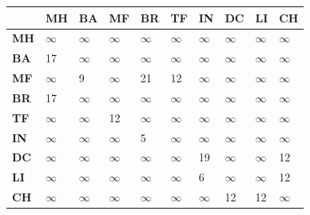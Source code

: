 \documentclass{article}
\begin{document}
\begin{enumerate}
\begin{table}[!h]
\centering
\begin{tabular}{|l|l|l|l|l|l|l|l|l|l|}
\hline
 & \textbf{MH} & \textbf{BA} & \textbf{MF} & \textbf{BR} & \textbf{TF} & \textbf{IN} & \textbf{DC} & \textbf{LI} & \textbf{CH} \\ \hline
\textbf{MH} & $\infty$ & $\infty$ & $\infty$ & $\infty$ & $\infty$ & $\infty$ & $\infty$ & $\infty$ & $\infty$ \\ \hline
\textbf{BA} & 17 & $\infty$ & $\infty$ & $\infty$ & $\infty$ & $\infty$ & $\infty$ & $\infty$ & $\infty$ \\ \hline
\textbf{MF} & $\infty$ & 9 & $\infty$ & 21 & 12 & $\infty$ & $\infty$ & $\infty$ & $\infty$ \\ \hline
\textbf{BR} & 17 & $\infty$ & $\infty$ & $\infty$ & $\infty$ & $\infty$ & $\infty$ & $\infty$ & $\infty$ \\ \hline
\textbf{TF} & $\infty$ & $\infty$ & 12 & $\infty$ & $\infty$ & $\infty$ & $\infty$ & $\infty$ & $\infty$ \\ \hline
\textbf{IN} & $\infty$ & $\infty$ & $\infty$ & 5 & $\infty$ & $\infty$ & $\infty$ & $\infty$ & $\infty$ \\ \hline
\textbf{DC} & $\infty$ & $\infty$ & $\infty$ & $\infty$ & $\infty$ & 19 & $\infty$ & $\infty$ & 12 \\ \hline
\textbf{LI} & $\infty$ & $\infty$ & $\infty$ & $\infty$ & $\infty$ & 6 & $\infty$ & $\infty$ & 12 \\ \hline
\textbf{CH} & $\infty$ & $\infty$ & $\infty$ & $\infty$ & $\infty$ & $\infty$ & 12 & 12 & $\infty$ \\ \hline
\end{tabular}
\end{table}


\end{enumerate}
\end{document}
